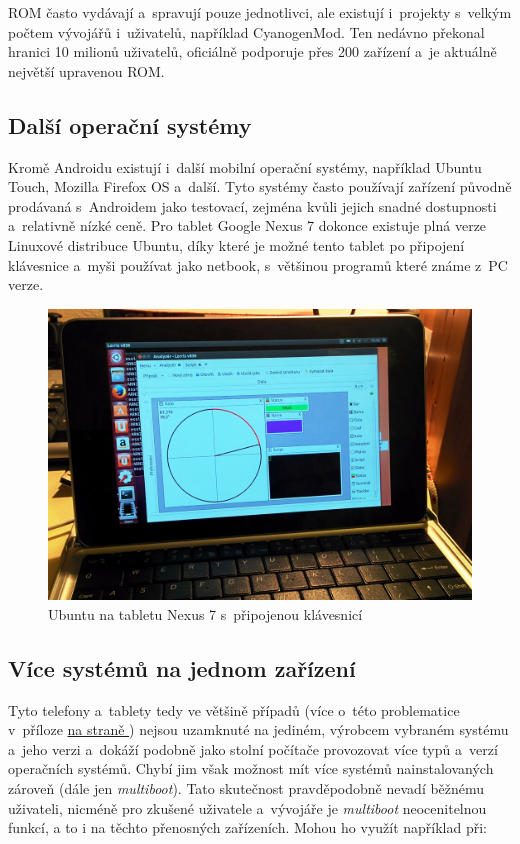 \documentclass[12pt, a4paper, oneside]{article}
\newcommand{\It}{\textit}  %
\newcommand*{\attref}[1]{\hyperref[{#1}]{\uv{\nameref*{#1}} na straně \pageref{#1}}}
\begin{document}
ROM často vydávají a~spravují pouze jednotlivci, ale existují i~projekty s~velkým počtem vývojářů i~uživatelů, například CyanogenMod\cite{CM}. Ten nedávno překonal hranici 10 milionů uživatelů, oficiálně podporuje přes 200 zařízení a~je aktuálně největší upravenou ROM.

\subsection{Další operační systémy}
Kromě Androidu existují i~další mobilní operační systémy, například Ubuntu Touch\cite{utouch}, Mozilla Firefox OS\cite{firefoxos} a~další. Tyto systémy často používají zařízení původně prodávaná s~Androidem jako testovací, zejména kvůli jejich snadné dostupnosti a~relativně nízké ceně. Pro tablet Google Nexus 7 dokonce existuje plná verze Linuxové distribuce Ubuntu, díky které je možné tento tablet po připojení klávesnice a~myši používat jako netbook, s~většinou programů které známe z~PC verze.

\begin{figure}[H]
\begin{center}
\includegraphics[width=\textwidth]{img/n7_ubuntu.jpg}
\caption{Ubuntu na tabletu Nexus 7 s~připojenou klávesnicí}
\end{center}
\end{figure}

\subsection{Více systémů na jednom zařízení}
Tyto telefony a~tablety tedy ve většině případů (více o~této problematice v~příloze \attref{sec:locked}) nejsou uzamknuté na jediném, výrobcem vybraném systému a~jeho verzi a~dokáží podobně jako stolní počítače provozovat více typů a~verzí operačních systémů. Chybí jim však možnost mít více systémů nainstalovaných zároveň (dále jen \It{multiboot}). Tato skutečnost pravděpodobně nevadí běžnému uživateli, nicméně pro zkušené uživatele a~vývojáře je \It{multiboot} neocenitelnou funkcí, a to i na těchto přenosných zařízeních. Mohou ho využít například při:
\end{document}
